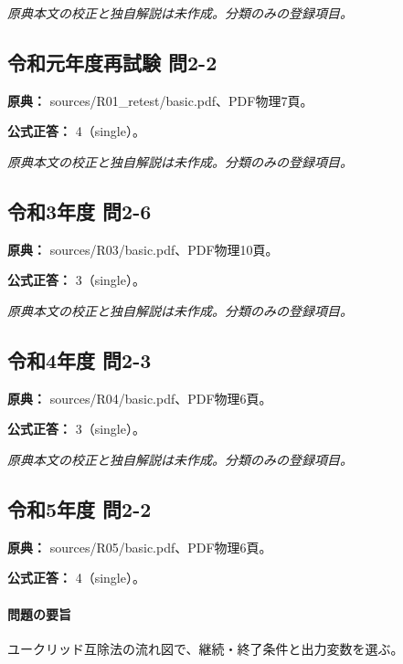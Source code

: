 \par\textit{原典本文の校正と独自解説は未作成。分類のみの登録項目。}

\subsection{令和元年度再試験 問2-2}
\label{q:r01-ret-basic-2-2}

\noindent\textbf{原典：} sources/R01\_retest/basic.pdf、PDF物理7頁。

\textbf{公式正答：} 4（single）。

\par\textit{原典本文の校正と独自解説は未作成。分類のみの登録項目。}

\subsection{令和3年度 問2-6}
\label{q:r03-reg-basic-2-6}

\noindent\textbf{原典：} sources/R03/basic.pdf、PDF物理10頁。

\textbf{公式正答：} 3（single）。

\par\textit{原典本文の校正と独自解説は未作成。分類のみの登録項目。}

\subsection{令和4年度 問2-3}
\label{q:r04-reg-basic-2-3}

\noindent\textbf{原典：} sources/R04/basic.pdf、PDF物理6頁。

\textbf{公式正答：} 3（single）。

\par\textit{原典本文の校正と独自解説は未作成。分類のみの登録項目。}

\subsection{令和5年度 問2-2}
\label{q:r05-reg-basic-2-2}

\noindent\textbf{原典：} sources/R05/basic.pdf、PDF物理6頁。

\textbf{公式正答：} 4（single）。

\paragraph{問題の要旨} ユークリッド互除法の流れ図で、継続・終了条件と出力変数を選ぶ。

